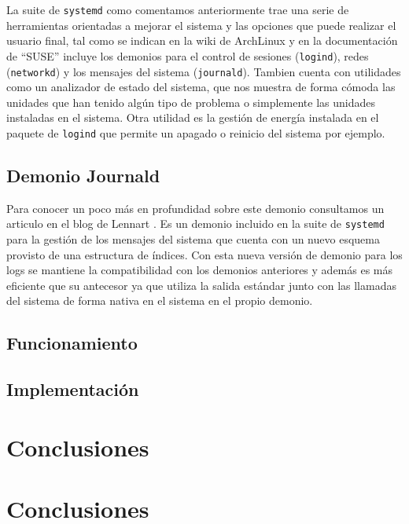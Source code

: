 La suite de \texttt{systemd} como comentamos anteriormente trae una serie de herramientas orientadas a mejorar el sistema y las opciones que puede realizar el usuario final, tal como se indican en la wiki de ArchLinux \cite{systemd_es} y en la documentación de ``SUSE'' \cite{suse_doc} incluye los demonios para el control de sesiones (\texttt{logind}), redes (\texttt{networkd}) y los mensajes del sistema (\texttt{journald}). Tambien cuenta con utilidades como un analizador de estado del sistema, que nos muestra de forma cómoda las unidades que han tenido algún tipo de problema o simplemente las unidades instaladas en el sistema. Otra utilidad es la gestión de energía instalada en el paquete de \texttt{logind} que permite un apagado o reinicio del sistema por ejemplo.\\


\subsection{Demonio Journald}
Para conocer un poco más en profundidad sobre este demonio consultamos un articulo en el blog de Lennart \cite{Journald}. Es un demonio incluido en la suite de \texttt{systemd} para la gestión de los mensajes del sistema que cuenta con un nuevo esquema provisto de una estructura de índices. Con esta nueva versión de demonio para los logs se mantiene la compatibilidad con los demonios anteriores y además es más eficiente que su antecesor ya que utiliza la salida estándar junto con las llamadas del sistema de forma nativa en el sistema en el propio demonio.





\subsection{Funcionamiento}

\subsection{Implementación}

\section{Conclusiones}

\section{Conclusiones} %

